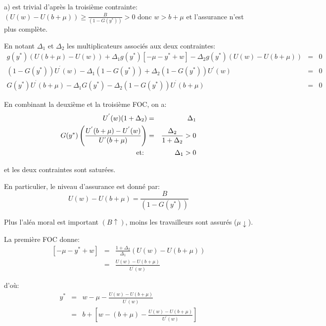 \documentclass[a4paper]{article}
\begin{document}
a) est trivial d'apr\`{e}s la troisi\`{e}me contrainte: $\left( U(w)-U(b+\mu
)\right) \geq \frac{B}{\left( 1-G(y^{\ast })\right) }>0$ donc $w>b+\mu $ et
l'assurance n'est plus compl\`{e}te.

En notant $\Delta _{1}$ et $\Delta _{2}$ les multiplicateurs associ\'{e}s
aux deux contraintes:%
\begin{eqnarray*}
g(y^{\ast })\left( U(b+\mu )-U(w)\right) +\Delta _{1}g(y^{\ast })\left[ -\mu
-y^{\ast }+w\right] -\Delta _{2}g(y^{\ast })\left( U(w)-U(b+\mu )\right) &=&0
\\
\left( 1-G(y^{\ast })\right) U^{^{\prime }}(w)-\Delta _{1}\left( 1-G(y^{\ast
})\right) +\Delta _{2}\left( 1-G(y^{\ast })\right) U^{\prime }(w) &=&0 \\
G(y^{\ast })U^{^{\prime }}(b+\mu )-\Delta _{1}G(y^{\ast })-\Delta _{2}\left(
1-G(y^{\ast })\right) U^{^{\prime }}(b+\mu ) &=&0
\end{eqnarray*}

En combinant la deuxi\`{e}me et la troisi\`{e}me FOC, on a:%
\begin{eqnarray*}
U^{^{\prime }}(w)(1+\Delta _{2}) &=&\Delta _{1} \\
G(y^{\ast })\left( \frac{U^{^{\prime }}(b+\mu )-U^{^{\prime }}(w)}{%
U^{^{\prime }}(b+\mu )}\right) &=&\frac{\Delta _{2}}{1+\Delta _{2}}>0 \\
\text{ et: } &&\Delta _{1}>0
\end{eqnarray*}

et les deux contraintes sont satur\'{e}es.

En particulier, le niveau d'assurance est donn\'{e} par:%
\begin{equation*}
U(w)-U(b+\mu )=\frac{B}{\left( 1-G(y^{\ast })\right) }
\end{equation*}

Plus l'al\'{e}a moral est important $(B\uparrow )$, moins les travailleurs
sont assur\'{e}s ($\mu \downarrow $).

La premi\`{e}re FOC donne:%
\begin{eqnarray*}
\left[ -\mu -y^{\ast }+w\right] &=&\frac{1+\Delta _{2}}{\Delta _{1}}\left(
U(w)-U(b+\mu )\right) \\
&=&\frac{U(w)-U(b+\mu )}{U^{^{\prime }}(w)}
\end{eqnarray*}

d'o\`{u}:%
\begin{eqnarray*}
y^{\ast } &=&w-\mu -\frac{U(w)-U(b+\mu )}{U^{^{\prime }}(w)} \\
&=&b+\left[ w-(b+\mu )-\frac{U(w)-U(b+\mu )}{U^{\prime }(w)}\right]
\end{eqnarray*}
\end{document}
